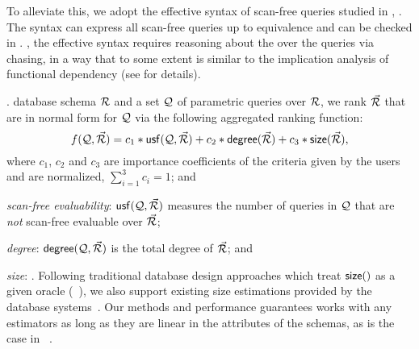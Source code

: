 \vspace{0.36ex}
To alleviate this, we adopt the effective syntax of scan-free
\SQL queries studied in \cite{VLDB19}, . The syntax can express
all scan-free \SQL queries up to equivalence and can be checked in
\PTIME. , the effective syntax requires reasoning about the \bss
over the queries via chasing, in a way that to some extent is
similar to the implication analysis of functional dependency
(see \cite{full} for details).


.  database schema ${\mathcal R}$ and a set $\mathcal Q$ of parametric
queries over ${\mathcal R}$, we rank \bds $\vec{{\mathcal R}}$ that are in normal
form for $\mathcal Q$ via the following aggregated ranking function:
\vspace{-0.7ex}
\[f(\Q, \kb{\R}) = c_{1}*\usf(\Q, \ak \kb{\R}) + c_{2}*\deg(\kb{\R}) + \ak c_{3}*\size(\kb{\R}),
\vspace{-0.7ex}\]
where $c_{1}$, $c_{2}$ and $c_{3}$ are importance coefficients
of the criteria given by the users and are normalized, \ie
$\sum_{i=1}^{3}c_{i} = 1$; and
\be
  \item {\em scan-free evaluability}: ${\mathsf{usf}}(\mathcal Q, \vec{{\mathcal R}})$ measures
  the number of
queries in $\mathcal Q$ that are {\em not} scan-free evaluable over $\vec{{\mathcal R}}$;
  \item {\em degree}: ${\mathsf{degree}}(\mathcal Q, \vec{{\mathcal R}})$ is the total degree of $\vec{{\mathcal R}}$;
    and
  \item {\em size}: .
  \ee
Following traditional database design approaches which treat
${\mathsf{size}}()$ as a given oracle (\eg~\cite{PapadomanolakisA07}), we
also support existing size estimations provided by the
database systems~\cite{BrunoCKNRS11}.  Our methods and
performance guarantees works with any estimators as long as they
are linear in the attributes of the schemas, as is the case in
\eg~\cite{PapadomanolakisA07}.



